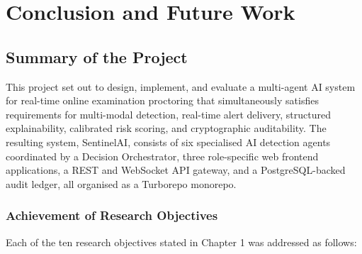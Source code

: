 \renewcommand{\baselinestretch}{1.5}\normalsize
\chapter{Conclusion and Future Work}

\section{Summary of the Project}

This project set out to design, implement, and evaluate a multi-agent AI system for real-time online examination proctoring that simultaneously satisfies requirements for multi-modal detection, real-time alert delivery, structured explainability, calibrated risk scoring, and cryptographic auditability. The resulting system, SentinelAI, consists of six specialised AI detection agents coordinated by a Decision Orchestrator, three role-specific web frontend applications, a REST and WebSocket API gateway, and a PostgreSQL-backed audit ledger, all organised as a Turborepo monorepo.

\subsection{Achievement of Research Objectives}

Each of the ten research objectives stated in Chapter 1 was addressed as follows:

